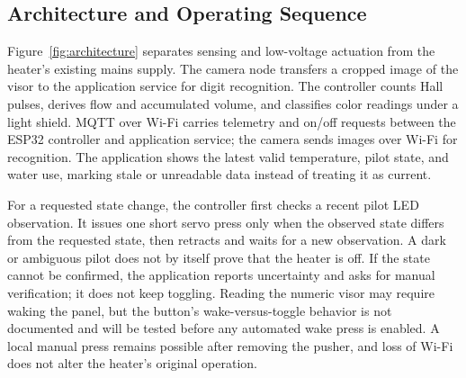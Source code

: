 \subsection{Architecture and Operating Sequence}
Figure~\ref{fig:architecture} separates sensing and low-voltage actuation from the heater's existing mains supply. The camera node transfers a cropped image of the visor to the application service for digit recognition. The controller counts Hall pulses, derives flow and accumulated volume, and classifies color readings under a light shield. MQTT over Wi-Fi carries telemetry and on/off requests between the ESP32 controller and application service; the camera sends images over Wi-Fi for recognition. The application shows the latest valid temperature, pilot state, and water use, marking stale or unreadable data instead of treating it as current.

For a requested state change, the controller first checks a recent pilot LED observation. It issues one short servo press only when the observed state differs from the requested state, then retracts and waits for a new observation. A dark or ambiguous pilot does not by itself prove that the heater is off. If the state cannot be confirmed, the application reports uncertainty and asks for manual verification; it does not keep toggling. Reading the numeric visor may require waking the panel, but the button's wake-versus-toggle behavior is not documented and will be tested before any automated wake press is enabled. A local manual press remains possible after removing the pusher, and loss of Wi-Fi does not alter the heater's original operation.

